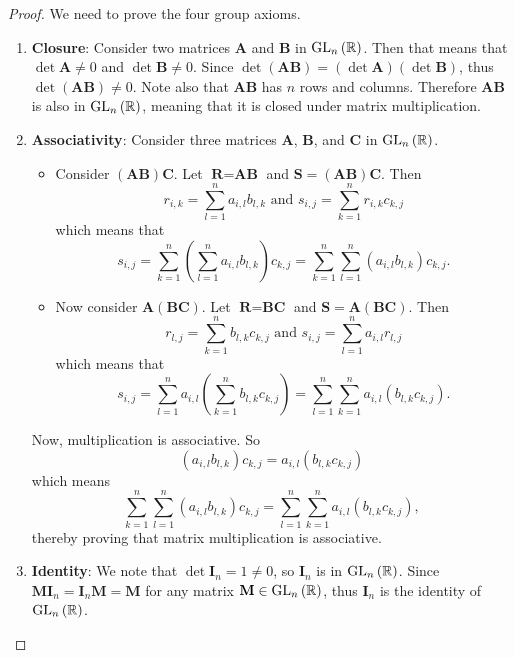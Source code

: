 \begin{proof}
    We need to prove the four group axioms.
    \begin{enumerate}
        \item \textbf{Closure}: Consider two matrices \textbf{A} and \textbf{B} in $\mathrm{GL}_{n}\left(\mathbb{R}\right)$. Then that means that $\det \textbf{A} \neq 0$ and $\det \textbf{B} \neq 0$. Since $\det(\textbf{AB}) = (\det \textbf{A})(\det \textbf{B})$, thus $\det(\textbf{AB}) \neq 0$. Note also that $\textbf{AB}$ has $n$ rows and columns. Therefore $\textbf{AB}$ is also in $\mathrm{GL}_{n}\left(\mathbb{R}\right)$, meaning that it is closed under matrix multiplication.
        
        \item \textbf{Associativity}: Consider three matrices \textbf{A}, \textbf{B}, and \textbf{C} in $\mathrm{GL}_{n}\left(\mathbb{R}\right)$.
        \begin{itemize}
            \item Consider $(\textbf{AB})\textbf{C}$. Let $\textbf{R} = \textbf{AB}$ and $\textbf{S} = (\textbf{AB})\textbf{C}$. Then
            \[
                r_{i,k} = \sum_{l=1}^n a_{i,l}b_{l,k} \text{ and } s_{i,j} = \sum_{k=1}^n r_{i,k}c_{k,j}
            \]
            which means that
            \[
                s_{i,j} = \sum_{k=1}^n \left(\sum_{l=1}^n a_{i,l}b_{l,k}\right)c_{k,j} = \sum_{k=1}^n \sum_{l=1}^n (a_{i,l}b_{l,k})c_{k,j}.
            \]
            \item Now consider $\textbf{A}(\textbf{BC})$. Let $\textbf{R} = \textbf{BC}$ and $\textbf{S} = \textbf{A}(\textbf{BC})$. Then
            \[
                r_{l,j} = \sum_{k=1}^nb_{l,k}c_{k,j} \text{ and } s_{i,j} = \sum_{l=1}^n a_{i,l}r_{l,j}
            \]
            which means that
            \[
                s_{i,j} = \sum_{l=1}^n a_{i,l}\left(\sum_{k=1}^nb_{l,k}c_{k,j}\right) = \sum_{l=1}^n\sum_{k=1}^n a_{i,l}(b_{l,k}c_{k,j}).
            \]
        \end{itemize}
        Now, multiplication is associative. So
        \[
                (a_{i,l}b_{l,k})c_{k,j} = a_{i,l}(b_{l,k}c_{k,j})
        \]
        which means
        \[
            \sum_{k=1}^n \sum_{l=1}^n (a_{i,l}b_{l,k})c_{k,j} = \sum_{l=1}^n\sum_{k=1}^n a_{i,l}(b_{l,k}c_{k,j}),
        \]
        thereby proving that matrix multiplication is associative.
        
        \item \textbf{Identity}: We note that $\det \textbf{I}_n = 1 \neq 0$, so $\textbf{I}_n$ is in $\mathrm{GL}_{n}\left(\mathbb{R}\right)$. Since $\textbf{MI}_n = \textbf{I}_n\textbf{M} = \textbf{M}$ for any matrix $\textbf{M} \in \mathrm{GL}_{n}\left(\mathbb{R}\right)$, thus $\textbf{I}_n$ is the identity of $\mathrm{GL}_{n}\left(\mathbb{R}\right)$.
        

\end{enumerate}
\end{proof}
